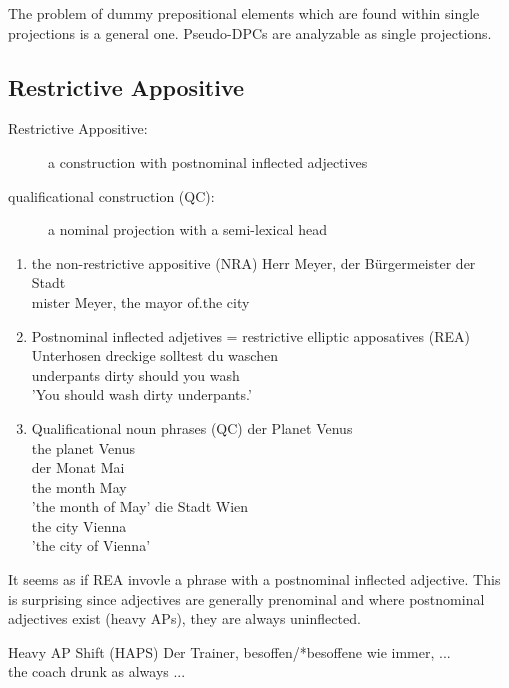 \documentclass{article}
\begin{document}
The problem of dummy prepositional elements which are found within single projections is a general one. Pseudo-DPCs are analyzable as single projections.

\subsection{Restrictive Appositive}
\begin{description}
\item[Restrictive Appositive: ] 
a construction with postnominal inflected adjectives
\item[qualificational construction (QC):]
a nominal projection with a semi-lexical head
\end{description}
\begin{example}
\label{}
\begin{enumerate}
\item the non-restrictive appositive (NRA)
   \gll Herr Meyer, der B\"{u}rgermeister der Stadt\\
mister Meyer, the mayor of.the city\\
\item Postnominal inflected adjetives = restrictive elliptic apposatives (REA)
\gll Unterhosen dreckige solltest du waschen\\
underpants dirty should you wash\\
'You should wash dirty underpants.'
\item Qualificational noun phrases (QC)
\gll der Planet Venus\\
the planet Venus\\
\gll der Monat Mai\\
the month May\\
'the month of May'
\gll die Stadt Wien\\
the city Vienna\\
'the city of Vienna'
   \glt
   \glend
\end{enumerate}
   \end{example}

It seems as if REA invovle a phrase with a postnominal inflected adjective. This is surprising since adjectives are generally prenominal and where postnominal adjectives exist (heavy APs), they are always uninflected.

\begin{example}
\label{}
Heavy AP Shift (HAPS)
   \gll Der Trainer, besoffen/*besoffene wie immer, ...\\
the coach drunk as always ...\\

   \glt
   \glend
   \end{example}
\end{document}
